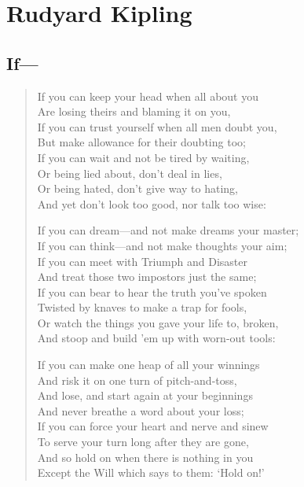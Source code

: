 \documentclass[10pt,a5paper,oneside]{book}
\begin{document}
\part{Rudyard Kipling}

\chapter{If---}

\begin{verse}
If you can keep your head when all about you\\
\hspace{1em}Are losing theirs and blaming it on you,\\
If you can trust yourself when all men doubt you,\\
\hspace{1em}But make allowance for their doubting too;\\
If you can wait and not be tired by waiting,\\
\hspace{1em}Or being lied about, don't deal in lies,\\
Or being hated, don't give way to hating,\\
\hspace{1em}And yet don't look too good, nor talk too wise:

If you can dream---and not make dreams your master;\\
\hspace{1em}If you can think---and not make thoughts your aim;\\
If you can meet with Triumph and Disaster\\
\hspace{1em}And treat those two impostors just the same;\\
If you can bear to hear the truth you've spoken\\
\hspace{1em}Twisted by knaves to make a trap for fools,\\
Or watch the things you gave your life to, broken,\\
\hspace{1em}And stoop and build 'em up with worn-out tools:

If you can make one heap of all your winnings\\
\hspace{1em}And risk it on one turn of pitch-and-toss,\\
And lose, and start again at your beginnings\\
\hspace{1em}And never breathe a word about your loss;\\
If you can force your heart and nerve and sinew\\
\hspace{1em}To serve your turn long after they are gone,\\
And so hold on when there is nothing in you\\
\hspace{1em}Except the Will which says to them: `Hold on!'


\end{verse}
\end{document}
